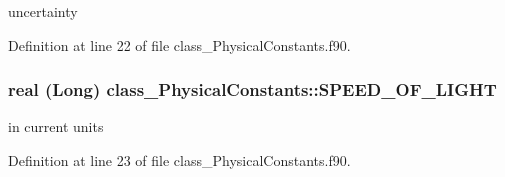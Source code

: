 uncertainty 



Definition at line 22 of file class\_\-PhysicalConstants.f90.

\hypertarget{namespaceclass__PhysicalConstants_a44b1992769a901faa8885324ef348271}{
\subsubsection[{SPEED\_\-OF\_\-LIGHT}]{\setlength{\rightskip}{0pt plus 5cm}real (Long) {\bf class\_\-PhysicalConstants::SPEED\_\-OF\_\-LIGHT}}}
\label{namespaceclass__PhysicalConstants_a44b1992769a901faa8885324ef348271}


in current units 



Definition at line 23 of file class\_\-PhysicalConstants.f90.

